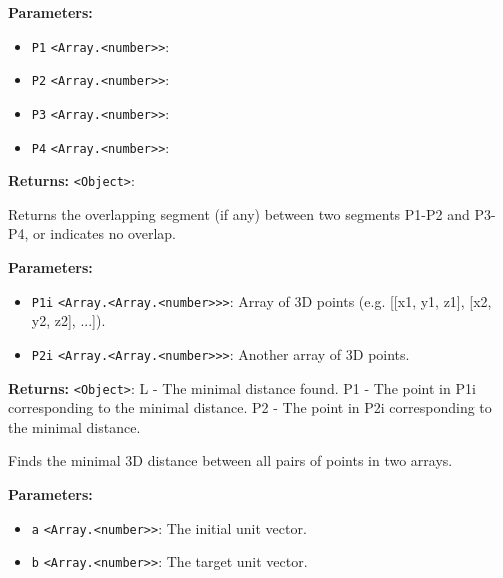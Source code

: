 \documentclass[12pt,a4paper]{article}
\begin{document}
\vspace{5mm}
\noindent {}


\noindent \textbf{Parameters:}
\begin{itemize}
  \item \texttt{P1} \texttt{<Array.<number>>}: 
  \item \texttt{P2} \texttt{<Array.<number>>}: 
  \item \texttt{P3} \texttt{<Array.<number>>}: 
  \item \texttt{P4} \texttt{<Array.<number>>}: 
\end{itemize}

\noindent \textbf{Returns:} \texttt{<Object>}: 

\noindent Returns the overlapping segment (if any) between two segments P1-P2 and P3-P4,
or indicates no overlap.

\vspace{5mm}
\noindent {}


\noindent \textbf{Parameters:}
\begin{itemize}
  \item \texttt{P1i} \texttt{<Array.<Array.<number>>>}: Array of 3D points (e.g. [[x1, y1, z1], [x2, y2, z2], ...]).
  \item \texttt{P2i} \texttt{<Array.<Array.<number>>>}: Another array of 3D points.
\end{itemize}

\noindent \textbf{Returns:} \texttt{<Object>}: L  - The minimal distance found.
  P1 - The point in P1i corresponding to the minimal distance.
  P2 - The point in P2i corresponding to the minimal distance.

\noindent Finds the minimal 3D distance between all pairs of points in two arrays.

\vspace{5mm}
\noindent {}


\noindent \textbf{Parameters:}
\begin{itemize}
  \item \texttt{a} \texttt{<Array.<number>>}: The initial unit vector.
  \item \texttt{b} \texttt{<Array.<number>>}: The target unit vector.
\end{itemize}
\end{document}

